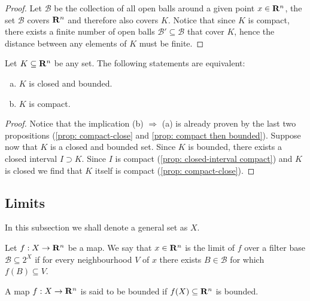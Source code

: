\begin{proof}
  Let \(\mathcal B\) be the collection of all open balls around a given point
  \(x \in \mathbf{R}^n\), the set \(\mathcal B\) covers \(\mathbf{R}^n\) and therefore also
  covers \(K\). Notice that since \(K\) is compact, there exists a finite number
  of open balls \(\mathcal B' \subseteq \mathcal B\) that cover \(K\), hence the
  distance between any elements of \(K\) must be finite.
\end{proof}

\begin{theorem}\label{heine-borel}
  Let \(K \subseteq \mathbf{R}^n\) be any set. The following statements are equivalent:
  \begin{enumerate}[(a)]
    \item \(K\) is closed and bounded.
    \item \(K\) is compact.
  \end{enumerate}
\end{theorem}

\begin{proof}
  Notice that the implication (b) \(\Rightarrow\) (a) is already proven by the
  last two propositions (\cref{prop: compact-close} and \ref{prop: compact then
  bounded}). Suppose now that \(K\) is a closed and bounded set. Since \(K\) is
  bounded, there exists a closed interval \(I \supset K\). Since \(I\) is
  compact (\cref{prop: closed-interval compact}) and \(K\) is closed we find
  that \(K\) itself is compact (\cref{prop: compact-close}).
\end{proof}

\subsection{Limits}

\begin{remark}
  In this subsection we shall denote a general set as \(X\).
\end{remark}

\begin{definition}[Limit]\label{def: limit-several}
  Let \(f: X \to \mathbf{R}^n\) be a map. We say that \(x \in \mathbf{R}^n\) is the limit of
  \(f\) over a filter base \(\mathcal B \subseteq  2^X\) if for every
  neighbourhood \(V\) of \(x\) there exists \(B \in \mathcal B\) for which
  \(f(B) \subseteq V\).
\end{definition}

\begin{definition}[Bounded]\label{def: bounded-several}
  A map \(f: X \to \mathbf{R}^n\) is said to be bounded if \(f(X) \subseteq \mathbf{R}^n\) is
  bounded.
\end{definition}

